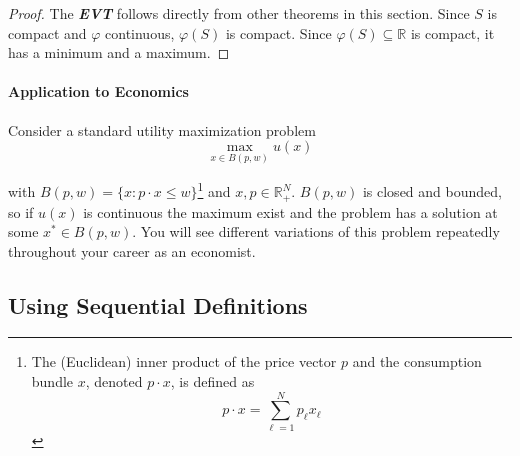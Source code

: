 \documentclass{article}
\newcommand{\keyword}[1]{\textit{\textbf{#1}}\index{#1}}
\theoremstyle{mythm}
\theoremstyle{mydef}
\begin{document}
\begin{proof}
  The \keyword{EVT} follows directly from other theorems in this section. Since $S$ is compact and $\varphi$ continuous, $\varphi(S)$ is compact. Since $\varphi(S) \subseteq \mathbb{R}$ is compact, it has a minimum and a maximum.
\end{proof}

\paragraph{Application to Economics}
\label{par:application_to_economics}

Consider a standard utility maximization problem
\[
  \max_{x \in B(p, w)} u(x)
\]

with $B(p, w) = \{x: p \cdot x \le w\}$\footnote{
    The (Euclidean) inner product of the price vector $p$ and the consumption bundle $x$, denoted $p \cdot x$, is defined as 
    \begin{equation*}
        p\cdot x = \sum_{\ell=1}^N p_\ell x_\ell
    \end{equation*}
} and $x, p \in \mathbb{R}^N_+$. $B(p, w)$ is closed and bounded, so if $u(x)$ is continuous the maximum exist and the problem has a solution at some $x^* \in B(p, w)$. You will see different variations of this problem repeatedly throughout your career as an economist. 

\subsection{Using Sequential Definitions}
\label{ssub:using_sequential_definitions}
\end{document}
